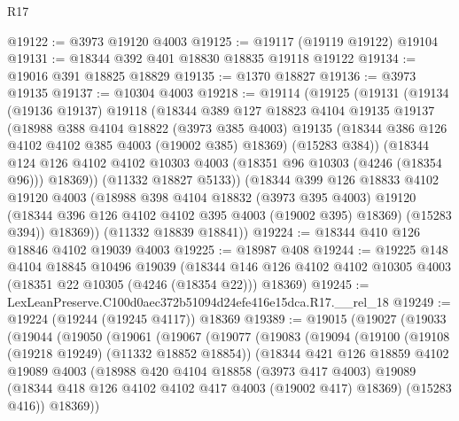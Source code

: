 \begin{lexlean}{R17}
\begin{coremodule}
@19122 := @3973 @19120 @4003
@19125 := @19117 (@19119 @19122) @19104
@19131 := @18344 @392 @401 @18830 @18835 @19118 @19122
@19134 := @19016 @391 @18825 @18829
@19135 := @1370 @18827
@19136 := @3973 @19135
@19137 := @10304 @4003
@19218 := @19114
    (@19125
      (@19131
        (@19134
          (@19136 @19137)
          @19118
          (@18344
            @389
            @127
            @18823
            @4104
            @19135
            @19137
            (@18988
              @388
              @4104
              @18822
              (@3973 @385 @4003)
              @19135
              (@18344 @386 @126 @4102 @4102 @385 @4003 (@19002 @385) @18369)
              (@15283 @384))
            (@18344
              @124
              @126
              @4102
              @4102
              @10303
              @4003
              (@18351 @96 @10303 (@4246 (@18354 @96)))
              @18369))
          (@11332 @18827 @5133))
        (@18344
          @399
          @126
          @18833
          @4102
          @19120
          @4003
          (@18988
            @398
            @4104
            @18832
            (@3973 @395 @4003)
            @19120
            (@18344 @396 @126 @4102 @4102 @395 @4003 (@19002 @395) @18369)
            (@15283 @394))
          @18369))
      (@11332 @18839 @18841))
@19224 := @18344 @410 @126 @18846 @4102 @19039 @4003
@19225 := @18987 @408
@19244 := @19225
    @148
    @4104
    @18845
    @10496
    @19039
    (@18344 @146 @126 @4102 @4102 @10305 @4003 (@18351 @22 @10305 (@4246 (@18354 @22))) @18369)
@19245 := LexLeanPreserve.C100d0aec372b51094d24efe416e15dca.R17.__rel_18
@19249 := @19224 (@19244 (@19245 @4117)) @18369
@19389 := @19015
    (@19027
      (@19033
        (@19044
          (@19050
            (@19061
              (@19067
                (@19077
                  (@19083
                    (@19094
                      (@19100
                        (@19108 (@19218 @19249) (@11332 @18852 @18854))
                        (@18344
                          @421
                          @126
                          @18859
                          @4102
                          @19089
                          @4003
                          (@18988
                            @420
                            @4104
                            @18858
                            (@3973 @417 @4003)
                            @19089
                            (@18344 @418 @126 @4102 @4102 @417 @4003 (@19002 @417) @18369)
                            (@15283 @416))
                          @18369))

\end{coremodule}
\end{lexlean}
